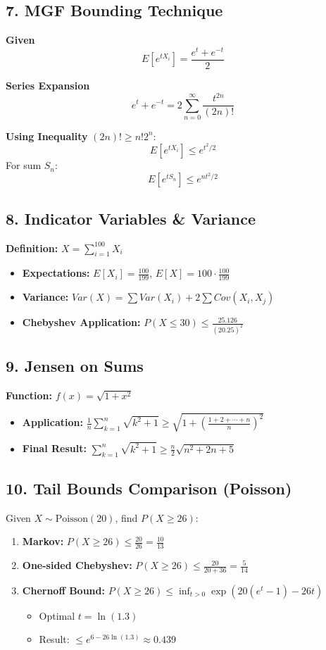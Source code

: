 \documentclass{article}
\begin{document}
\subsection*{7. MGF Bounding Technique}
\textbf{Given}
\[ E[e^{tX_i}] = \frac{e^t + e^{-t}}{2} \]

\textbf{Series Expansion}
\[ e^t + e^{-t} = 2 \sum_{n=0}^{\infty} \frac{t^{2n}}{(2n)!} \]

\textbf{Using Inequality} $(2n)! \ge n!2^n$:
\[ E[e^{tX_i}] \le e^{t^2/2} \]
For sum $S_n$:
\[ E[e^{tS_n}] \le e^{nt^2/2} \]

\subsection*{8. Indicator Variables \& Variance}
\textbf{Definition:} $X = \sum_{i=1}^{100} X_i$
\begin{itemize}
    \item \textbf{Expectations:} $E[X_i] = \frac{100}{199}$, $E[X] = 100 \cdot \frac{100}{199}$
    \item \textbf{Variance:} $Var(X) = \sum Var(X_i) + 2\sum Cov(X_i,X_j)$
    \item \textbf{Chebyshev Application:} $P(X \le 30) \le \frac{25.126}{(20.25)^2}$
\end{itemize}

\subsection*{9. Jensen on Sums}
\textbf{Function:} $f(x) = \sqrt{1 + x^2}$
\begin{itemize}
    \item \textbf{Application:} $\frac{1}{n} \sum_{k=1}^n \sqrt{k^2 + 1} \ge \sqrt{1 + \left(\frac{1+2+\cdots+n}{n}\right)^2}$
    \item \textbf{Final Result:} $\sum_{k=1}^n \sqrt{k^2 + 1} \ge \frac{n}{2}\sqrt{n^2 + 2n + 5}$
\end{itemize}

\subsection*{10. Tail Bounds Comparison (Poisson)}
Given $X \sim \text{Poisson}(20)$, find $P(X \ge 26)$:
\begin{enumerate}
    \item \textbf{Markov:} $P(X \ge 26) \le \frac{20}{26} = \frac{10}{13}$
    \item \textbf{One-sided Chebyshev:} $P(X \ge 26) \le \frac{20}{20 + 36} = \frac{5}{14}$
    \item \textbf{Chernoff Bound:} $P(X \ge 26) \le \inf_{t>0} \exp(20(e^t - 1) - 26t)$
    \begin{itemize}
        \item Optimal $t = \ln(1.3)$
        \item Result: $\le e^{6 - 26\ln(1.3)} \approx 0.439$
    \end{itemize}
\end{enumerate}
\end{document}
